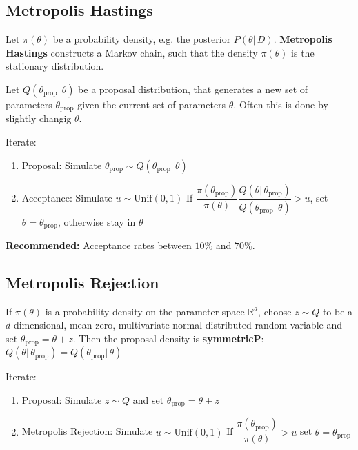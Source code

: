 \subsection{Metropolis Hastings}
Let $\pi(\theta)$ be a probability density,
e.g. the posterior $P(\theta|\,D)$.
\textbf{Metropolis Hastings} constructs a Markov chain,
such that the density $\pi(\theta)$ is the stationary distribution.

Let $Q(\theta_\text{prop}|\,\theta)$ be a proposal distribution,
that generates a new set of parameters $\theta_\text{prop}$ given the current
set of parameters $\theta$.
Often this is done by slightly changig $\theta$.

Iterate:
\begin{enumerate}
\item Proposal: Simulate $\theta_\text{prop} \sim
Q(\theta_\text{prop}|\,\theta)$
\item Acceptance: Simulate $u \sim \text{Unif}(0, 1)$
If $\dfrac{\pi(\theta_\text{prop})}{\pi(\theta)}
\dfrac{Q(\theta|\,\theta_\text{prop})}{Q(\theta_\text{prop}|\,\theta)} > u$,
set $\theta = \theta_\text{prop}$,
otherwise stay in $\theta$
\end{enumerate}

\textbf{Recommended:} Acceptance rates between $10\%$ and $70\%$.

\subsection{Metropolis Rejection}
If $\pi(\theta)$ is a probability density
on the parameter space $\mathbb{R}^d$,
choose $z \sim Q$ to be a $d$-dimensional, mean-zero, multivariate normal
distributed random variable and set $\theta_\text{prop} = \theta + z$.
Then the proposal density is \textbf{symmetricP}:
$Q(\theta|\,\theta_\text{prop}) = Q(\theta_\text{prop}|\,\theta)$

Iterate:
\begin{enumerate}
\item Proposal: Simulate $z \sim Q$ and set $\theta_\text{prop} = \theta + z$
\item Metropolis Rejection: Simulate $u \sim \text{Unif}(0, 1)$
If $\dfrac{\pi(\theta_\text{prop})}{\pi(\theta)} > u$
set $\theta = \theta_\text{prop}$
\end{enumerate}